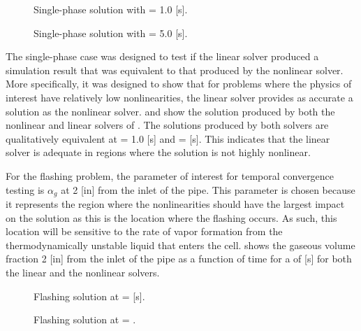 \begin{figure}[h!tb]
\centering

\caption{Single-phase solution with \dtmax{} = 1.0 {[s]}.}
\label{fig:single1pt000em0}
\end{figure}

\begin{figure}[h!tb]
\centering

\caption{Single-phase solution with \dtmax{} = 5.0 {[s]}.}
\label{fig:single1pt000em5}
\end{figure}

The single-phase case was designed to test if the linear solver produced a simulation result that was equivalent to that produced by the nonlinear solver.
More specifically, it was designed to show that for problems where the physics of interest have relatively low nonlinearities, the linear solver provides as accurate a solution as the nonlinear solver.
 and  show the solution produced by both the nonlinear and linear solvers of \cobra{}.
The solutions produced by both solvers are qualitatively equivalent at \dtmax{} = 1.0 [s] and \dtmax{} =  [s].
This indicates that the linear solver is adequate in regions where the solution is not highly nonlinear.

For the flashing problem, the parameter of interest for temporal convergence testing is $\alpha_g$ at 2 [in] from the inlet of the pipe.
This parameter is chosen because it represents the region where the nonlinearities should have the largest impact on the solution as this is the location where the flashing occurs.
As such, this location will be sensitive to the rate of vapor formation from the thermodynamically unstable liquid that enters the cell.
 shows the gaseous volume fraction 2 [in] from the inlet of the pipe as a function of time for a \dtmax{} of  [s] for both the linear and the nonlinear solvers.

\begin{figure}[h!tb]
\centering

\caption{Flashing solution at \dtmax{} =  {[s]}.}
\label{fig:flashing1pt0000em0}
\end{figure}

\begin{figure}[h!tb]
\centering

\caption{Flashing solution at \dtmax{} = .}
\label{fig:flashing1pt0000em5}
\end{figure}

